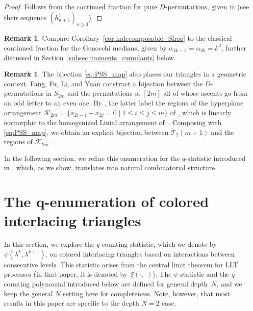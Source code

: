 \documentclass[10pt,a4paper]{amsart}
\numberwithin{equation}{section}
\theoremstyle{definition}
\newtheorem{Remark}[Theorem]{Remark}
\begin{document}
\begin{proof}
Follows from
the continued fraction for pure $D$-permutations, given in \cite{DebSokal2024}  (see their sequence
$(h^\flat_{n+1})_{n\ge0}$).
\end{proof}

\begin{Remark}\label{rem:classical_Sfrac}
Compare Corollary~\ref{cor:indecomposable_Sfrac} to the classical
continued fraction for the Genocchi medians, given by $\alpha_{2k-1}=\alpha_{2k}=k^2$, further discussed in
Section~\ref{subsec:moments_cumulants} below.\end{Remark}

\begin{Remark}
	\label{rem:hyperplane_regions}
	The bijection \eqref{eq:PSS_map} also places our triangles in a geometric
	context.
	Fang, Fu, Li, and Yuan
	\cite[Theorem~4.8]{FangFuLiYuan2025} construct a bijection between the
	$D$-permutations in $S_{2m}$ and the permutations of $[2m]$ all of whose
	ascents go from an odd letter to an even one.
	By \cite[Theo\-rem~1.4]{FangFuLiYuan2025}, the latter label the regions of
	the hyperplane arrangement
	$\mathcal{K}_{2m}=\{{x_{2i-1}-x_{2j}=0}\mid 1\le i\le j\le m\}$ of
	\cite{LazarWachs2019}, which is linearly isomorphic to the homogenized
	Linial arrangement of~\cite{Hetyei2019}.
	Composing with \eqref{eq:PSS_map}, we obtain an explicit bijection between
	$\mathring{\mathcal{T}}_2(m+1)$ and the regions of $\mathcal{K}_{2m}$.
\end{Remark}


In the following section, we refine this enumeration for the $q$-statistic
introduced in \cite{ABW2023coloured_LLT},
which, as we show, translates into natural combinatorial structure.


\section[The q-enumeration of colored interlacing triangles]{The $\boldsymbol{q}$-enumeration of colored interlacing triangles}
\label{sec:q_enumeration}

In this section, we explore the $q$-counting statistic, which we denote by
$\psi(\lambda^{k},\lambda^{k+1})$, on colored interlacing triangles based on
interactions between consecutive levels.
This statistic
arises from the
central limit theorem for LLT processes \cite[Section~1.6]{ABW2023coloured_LLT} (in that paper,
it is denoted by~$\xi(\cdot,\cdot)$).
The $\psi$-statistic and the $q$-counting polynomial introduced below are
defined for general depth~$N$, and we keep the general $N$ setting here for completeness.
Note, however, that most results in this paper are specific to the depth $N=2$ case.
\end{document}
